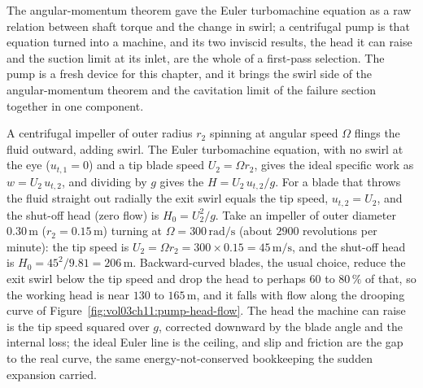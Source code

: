 The angular-momentum theorem gave the Euler turbomachine equation as a
raw relation between shaft torque and the change in swirl; a
centrifugal pump is that equation turned into a machine, and its two
inviscid results, the head it can raise and the suction limit at its
inlet, are the whole of a first-pass selection. The pump is a fresh
device for this chapter, and it brings the swirl side of the
angular-momentum theorem and the cavitation limit of the failure
section together in one component.



A centrifugal impeller of outer radius $r_2$ spinning at angular speed
$\Omega$ flings the fluid outward, adding swirl. The Euler turbomachine
equation, with no swirl at the eye ($u_{t,1} = 0$) and a tip blade
speed $U_2 = \Omega r_2$, gives the ideal specific work as $w =
U_2\,u_{t,2}$, and dividing by $g$ gives the 
$H = U_2\,u_{t,2}/g$. For a blade that throws the fluid straight out
radially the exit swirl equals the tip speed, $u_{t,2} = U_2$, and the
shut-off head (zero flow) is $H_0 = U_2^2/g$. Take an impeller of
outer diameter $0.30\,\si{\meter}$ ($r_2 = 0.15\,\si{\meter}$) turning
at $\Omega = 300\,\si{\radian\per\second}$ (about $2900$ revolutions
per minute): the tip speed is $U_2 = \Omega r_2 = 300\times 0.15 =
45\,\si{\meter\per\second}$, and the shut-off head is $H_0 = 45^2/9.81
= 206\,\si{\meter}$. Backward-curved blades, the usual choice, reduce
the exit swirl below the tip speed and drop the head to perhaps $60$ to
$80\,\%$ of that, so the working head is near $130$ to
$165\,\si{\meter}$, and it falls with flow along the drooping curve of
Figure~\ref{fig:vol03ch11:pump-head-flow}. The head the machine can
raise is the tip speed squared over $g$, corrected downward by the
blade angle and the internal loss; the ideal Euler line is the ceiling,
and slip and friction are the gap to the real curve, the same
energy-not-conserved bookkeeping the sudden expansion carried.

